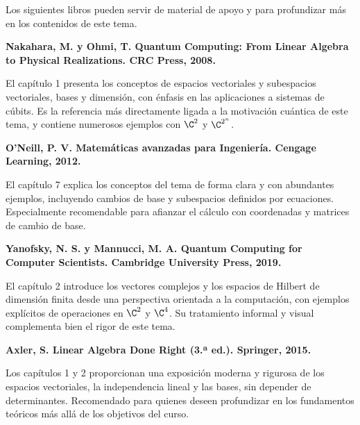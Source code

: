 
Los siguientes libros pueden servir de material de apoyo y para profundizar más en los contenidos de este tema.

\textbf{Nakahara, M. y Ohmi, T. Quantum Computing: From Linear Algebra to Physical Realizations. CRC Press, 2008.}

El capítulo 1 presenta los conceptos de espacios vectoriales y subespacios vectoriales, bases y dimensión, con énfasis en las aplicaciones a sistemas de cúbits. Es la referencia más directamente ligada a la motivación cuántica de este tema, y contiene numerosos ejemplos con $\C^2$ y $\C^{2^n}$.

\textbf{O'Neill, P. V. Matemáticas avanzadas para Ingeniería. Cengage Learning, 2012.}

El capítulo 7 explica los conceptos del tema de forma clara y con abundantes ejemplos, incluyendo cambios de base y subespacios definidos por ecuaciones. Especialmente recomendable para afianzar el cálculo con coordenadas y matrices de cambio de base.

\textbf{Yanofsky, N. S. y Mannucci, M. A. Quantum Computing for Computer Scientists. Cambridge University Press, 2019.}

El capítulo 2 introduce los vectores complejos y los espacios de Hilbert de dimensión finita desde una perspectiva orientada a la computación, con ejemplos explícitos de operaciones en $\C^2$ y $\C^4$. Su tratamiento informal y visual complementa bien el rigor de este tema.

\textbf{Axler, S. Linear Algebra Done Right (3.ª ed.). Springer, 2015.}

Los capítulos 1 y 2 proporcionan una exposición moderna y rigurosa de los espacios vectoriales, la independencia lineal y las bases, sin depender de determinantes. Recomendado para quienes deseen profundizar en los fundamentos teóricos más allá de los objetivos del curso.